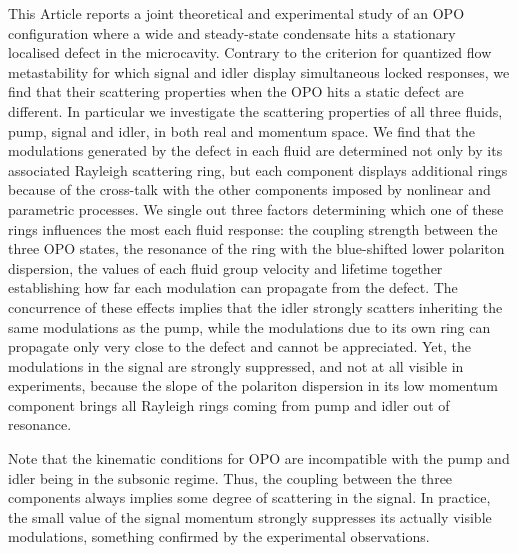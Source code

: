 This Article reports a joint theoretical and experimental study of an
OPO configuration where a wide and steady-state condensate hits a
stationary localised defect in the microcavity.
%
Contrary to the criterion for quantized flow metastability for which
signal and idler display simultaneous locked responses, we find that
their scattering properties when the OPO hits a static defect are
different.
%
In particular we investigate the scattering properties of all three
fluids, pump, signal and idler, in both real and momentum space. We
find that the modulations generated by the defect in each fluid are
determined not only by its associated Rayleigh scattering ring, but
each component displays additional rings because of the cross-talk
with the other components imposed by nonlinear and parametric
processes.
%
We single out three factors determining which one of these rings
influences the most each fluid response: the coupling strength between
the three OPO states, the resonance of the ring with the blue-shifted
lower polariton dispersion, the values of each fluid group velocity
and lifetime together establishing how far each modulation can
propagate from the defect.
%
The concurrence of these effects implies that the idler strongly
scatters inheriting the same modulations as the pump, while the
modulations due to its own ring can propagate only very close to the
defect and cannot be appreciated. Yet, the modulations in the signal
are strongly suppressed, and not at all visible in experiments,
because the slope of the polariton dispersion in its low momentum
component brings all Rayleigh rings coming from pump and idler out of
resonance.

Note that the kinematic conditions for OPO are incompatible with the
pump and idler being in the subsonic regime. Thus, the coupling
between the three components always implies some degree of scattering
in the signal. In practice, the small value of the signal momentum
strongly suppresses its actually visible modulations, something
confirmed by the experimental observations.


